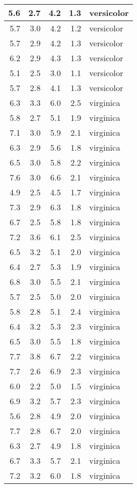 \begin{tabular}{r|r|r|r|l}
\hline
5.6 & 2.7 & 4.2 & 1.3 & versicolor\\
\hline
5.7 & 3.0 & 4.2 & 1.2 & versicolor\\
\hline
5.7 & 2.9 & 4.2 & 1.3 & versicolor\\
\hline
6.2 & 2.9 & 4.3 & 1.3 & versicolor\\
\hline
5.1 & 2.5 & 3.0 & 1.1 & versicolor\\
\hline
5.7 & 2.8 & 4.1 & 1.3 & versicolor\\
\hline
6.3 & 3.3 & 6.0 & 2.5 & virginica\\
\hline
5.8 & 2.7 & 5.1 & 1.9 & virginica\\
\hline
7.1 & 3.0 & 5.9 & 2.1 & virginica\\
\hline
6.3 & 2.9 & 5.6 & 1.8 & virginica\\
\hline
6.5 & 3.0 & 5.8 & 2.2 & virginica\\
\hline
7.6 & 3.0 & 6.6 & 2.1 & virginica\\
\hline
4.9 & 2.5 & 4.5 & 1.7 & virginica\\
\hline
7.3 & 2.9 & 6.3 & 1.8 & virginica\\
\hline
6.7 & 2.5 & 5.8 & 1.8 & virginica\\
\hline
7.2 & 3.6 & 6.1 & 2.5 & virginica\\
\hline
6.5 & 3.2 & 5.1 & 2.0 & virginica\\
\hline
6.4 & 2.7 & 5.3 & 1.9 & virginica\\
\hline
6.8 & 3.0 & 5.5 & 2.1 & virginica\\
\hline
5.7 & 2.5 & 5.0 & 2.0 & virginica\\
\hline
5.8 & 2.8 & 5.1 & 2.4 & virginica\\
\hline
6.4 & 3.2 & 5.3 & 2.3 & virginica\\
\hline
6.5 & 3.0 & 5.5 & 1.8 & virginica\\
\hline
7.7 & 3.8 & 6.7 & 2.2 & virginica\\
\hline
7.7 & 2.6 & 6.9 & 2.3 & virginica\\
\hline
6.0 & 2.2 & 5.0 & 1.5 & virginica\\
\hline
6.9 & 3.2 & 5.7 & 2.3 & virginica\\
\hline
5.6 & 2.8 & 4.9 & 2.0 & virginica\\
\hline
7.7 & 2.8 & 6.7 & 2.0 & virginica\\
\hline
6.3 & 2.7 & 4.9 & 1.8 & virginica\\
\hline
6.7 & 3.3 & 5.7 & 2.1 & virginica\\
\hline
7.2 & 3.2 & 6.0 & 1.8 & virginica\\

\end{tabular}
